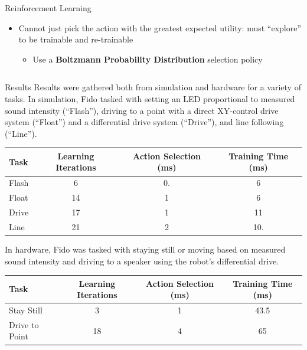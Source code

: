 \documentclass[final]{beamer}
\newlength{\onecolwid}
\newlength{\twocolwid}
\begin{document}
\begin{frame}[t]
\begin{columns}[t]
\begin{column}{\twocolwid}
\begin{columns}[t,totalwidth=\twocolwid]
\begin{column}{\onecolwid}
\begin{block}{Reinforcement Learning}
\begin{itemize}
		\item Cannot just pick the action with the greatest expected utility: must ``explore'' to be trainable and re-trainable
		\begin{itemize}
			\item Use a \textbf{Boltzmann Probability Distribution} selection policy
		\end{itemize}
	\end{itemize}
	\vspace{-1.25cm}
\end{block}\end{column} 

\end{columns} 

	\begin{block}{Results}
		Results were gathered both from simulation and hardware for a variety of tasks.  In simulation, Fido tasked with setting an LED proportional to measured sound intensity (``Flash''), driving to a point with a direct XY-control drive system (``Float'') and a differential drive system (``Drive''), and line following (``Line'').

		\begin{table}[ht]
			\centering
			\begin{tabular}{@{}lccc@{}}
				\toprule
				Task        & Learning Iterations & Action Selection (ms) & Training Time (ms) \\ \midrule
				Flash       & 6                   & 0.                  & 6               \\
				Float       & 14                  & 1                  & 6               \\
				Drive       & 17                  & 1                  & 11              \\
				Line        & 21                  & 2                  & 10.               \\ \bottomrule
			\end{tabular}
		\end{table}
		\vspace{.5cm}
		In hardware, Fido was tasked with staying still or moving based on measured sound intensity and driving to a speaker using the robot's differential drive.
		\begin{table}[ht]
			\centering
			\begin{tabular}{@{}lccc@{}}
				\toprule
				Task             & Learning Iterations & Action Selection (ms) & Training Time (ms) \\ \midrule
				Stay Still       & 3                   & 1                    & 43.5                  \\
				Drive to Point   & 18                  & 4                     & 65                  \\
			\end{tabular}
		\end{table}


\end{block}
\end{column}
\end{columns}
\end{frame}
\end{document}
